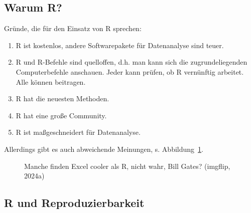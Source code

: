 \documentclass[
  letterpaper,
  oneside,
  open=any]{scrbook}
\theoremstyle{definition}
\theoremstyle{definition}
\theoremstyle{definition}
\theoremstyle{remark}
\begin{document}
\subsection{Warum R?}\label{warum-r}

Gründe, die für den Einsatz von R sprechen:

\begin{enumerate}
\def\labelenumi{\arabic{enumi}.}
\item
  R ist kostenlos, andere Softwarepakete für Datenanalyse sind teuer.
\item
  R und R-Befehle sind quelloffen, d.h. man kann sich die
  zugrundeliegenden Computerbefehle anschauen. Jeder kann prüfen, ob R
  vernünftig arbeitet. Alle können beitragen.
\item
  R hat die neuesten Methoden.
\item
  R hat eine große Community.
\item
  R ist maßgeschneidert für Datenanalyse.
\end{enumerate}

Allerdings gibt es auch abweichende Meinungen, s.
Abbildung~\ref{fig-bill-excel}.

\begin{figure}


\caption{\label{fig-bill-excel}Manche finden Excel cooler als R, nicht
wahr, Bill Gates? (imgflip, 2024a)}

\end{figure}%

\subsection{R und Reproduzierbarkeit}\label{r-und-reproduzierbarkeit}
\end{document}
